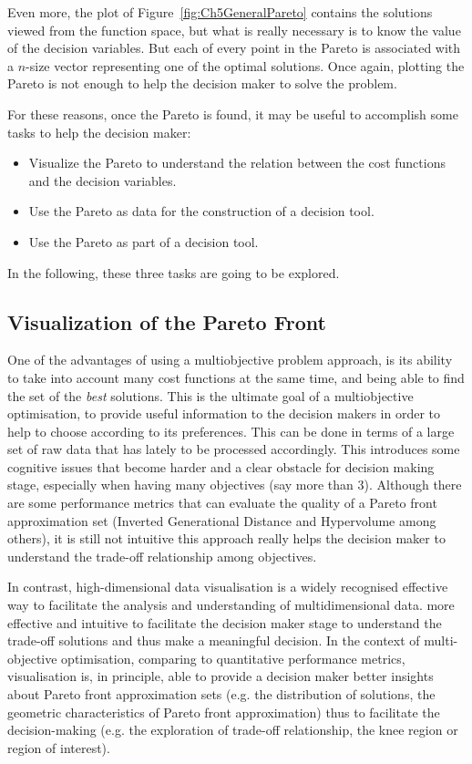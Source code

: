 Even more, the plot of Figure~\ref{fig:Ch5GeneralPareto} contains the solutions viewed from the function space, but what is really necessary is to know the value of the decision variables. But each of every point in the Pareto is associated with a $n$-size vector representing one of the optimal solutions. Once again, plotting the Pareto is not enough to help the decision maker to solve the problem.

For these reasons, once the Pareto is found, it may be useful to accomplish some tasks to help the decision maker:
\begin{itemize}
	\item  Visualize the Pareto to understand the relation between the cost functions and the decision variables.
	\item Use the Pareto as data for the construction of a decision tool.
	\item Use the Pareto as part of a decision tool.
\end{itemize}
In the following, these three tasks are going to be explored.
%
\subsection{Visualization of the Pareto Front}
\label{sec:ParetoVisualization}
%
One of the advantages of using a multiobjective problem approach, is its ability to take into account many cost functions at the same time, and being able to find the set of the \emph{best} solutions. This is the ultimate goal of a multiobjective optimisation, to provide useful information to the decision makers in order to help to choose according to its preferences. This can be done in terms of a large set of raw data that has lately to be processed accordingly. This introduces some cognitive issues that become harder and a clear obstacle for decision making stage, especially when having many objectives (say more than 3). Although there are some performance metrics that can evaluate the quality of a Pareto front approximation set (Inverted Generational Distance \cite{Bosman2003} and Hypervolume \cite{Zitzler1999} among others), it is still not intuitive this approach really helps the decision maker to understand the trade-off relationship among objectives.

In contrast, high-dimensional data visualisation is a widely recognised effective way to facilitate the analysis and understanding of multidimensional data. more effective and intuitive to facilitate the decision maker stage to understand the trade-off solutions and thus make a meaningful decision. In the context of multi-objective optimisation, comparing to quantitative performance metrics, visualisation is, in principle, able to provide a decision maker better insights about Pareto front approximation sets (e.g. the distribution of solutions, the geometric characteristics of Pareto front approximation) thus to facilitate the decision-making (e.g. the exploration of trade-off relationship, the knee region or region of interest).

